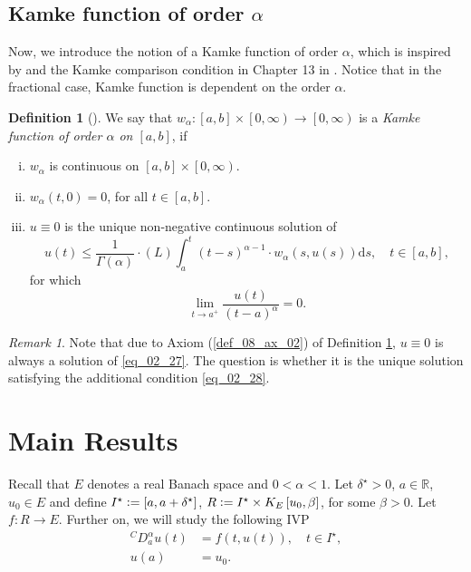 \documentclass[reqno]{amsart}
\numberwithin{equation}{section}
\theoremstyle{definition}
\newtheorem{definition}{Definition}
\theoremstyle{remark}
\newtheorem{remark}{Remark}
\newcommand{\axiomRef}[1]{\textrm{Axiom (\ref{#1})}}
\newcommand{\ball}[3]{K_{#1}\sbr{#2,#3}}
\newcommand{\br}[1]{\left(#1\right)}
\newcommand{\DC}[3]{{}^{C}\!D^{#1}_{#2}{#3}}
\newcommand{\definitionRef}[1]{\textrm{Definition \ref{#1}}}
\newcommand{\defeq}{\vcentcolon=}
\newcommand{\ds}{\mathrm{d}s}
\newcommand{\Lint}[3]{\br{L}\!\displaystyle\int_{#1}^{#2}{#3}}
\newcommand{\lsrbr}[1]{\left[#1\right)}
\newcommand{\R}{\mathbb{R}}
\newcommand{\sbr}[1]{\left[#1\right]}
\newcommand{\sdelta}{\delta^{\star}}
\newcommand{\sI}{I^{\star}}
\newcommand{\st}{\!:}
\begin{document}
	\subsection{Kamke function of order $\alpha$}\label{sec_02_07}
	Now, we introduce the notion of a Kamke function of order $\alpha$, which is inspired by \cite{Li} and the Kamke comparison condition in Chapter 13 in \cite{Banas_book}. Notice that in the fractional case, Kamke function is dependent on the order $\alpha$.
	\begin{definition}[]\label{def_08}
		We say that $w_{\alpha}\st\sbr{a,b}\times\lsrbr{0,\infty}\rightarrow\lsrbr{0,\infty}$ is a \textit{Kamke function of order $\alpha$ on $\sbr{a,b}$}, if
		\begin{enumerate}[(i)]
			\item $w_{\alpha}$ is continuous on $\sbr{a,b}\times\lsrbr{0,\infty}$.
			\item $w_{\alpha}\br{t,0}=0$, for all $t\in\sbr{a,b}$.\label{def_08_ax_02}
			\item $u\equiv0$ is the unique non-negative continuous solution of
			\begin{equation}\label{eq_02_27}
				u\br{t}\leq\frac{1}{\Gamma\br{\alpha}}\cdot\Lint{a}{t}{\br{t-s}^{\alpha-1}\cdot{w}_{\alpha}\br{s,u\br{s}}\ds},\quad{t}\in\sbr{a,b},
			\end{equation}
			for which
			\begin{equation}\label{eq_02_28}
				\lim_{t\rightarrow{a}^+}\frac{u\br{t}}{\br{t-a}^{\alpha}}=0.
			\end{equation}\label{def_08_ax_03}
		\end{enumerate}
	\end{definition}
	\begin{remark}
		Note that due to \axiomRef{def_08_ax_02} of \definitionRef{def_08}, $u\equiv0$ is always a solution of \eqref{eq_02_27}. The question is whether it is the unique solution satisfying the additional condition \eqref{eq_02_28}.
	\end{remark}

	\section{Main Results}\label{sec_03}
	\setcounter{section}{3}
	\setcounter{equation}{0}
	Recall that $E$ denotes a real Banach space and $0<\alpha<1$. Let $\sdelta>0$, $a\in\R$, $u_0\in{E}$ and define $\sI\defeq\sbr{a,a+\sdelta}$, $R\defeq\sI\times\ball{E}{u_0}{\beta}$, for some $\beta>0$. Let $f\st{R}\rightarrow{E}$. Further on, we will study the following IVP
	\begin{subequations}\label{eq_03_01}
		\begin{align}
			\DC{\alpha}{a}{u\br{t}}&=f\br{t,u\br{t}},\quad{t}\in\sI,\\
			u\br{a}&=u_0.\label{eq_03_01_02}
		\end{align}
	\end{subequations}
	
\end{document}

